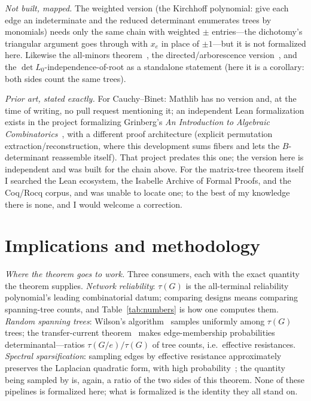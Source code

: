 \documentclass[11pt]{article}
\begin{document}
\emph{Not built, mapped.} The weighted version (the Kirchhoff polynomial: give each edge an
indeterminate and the reduced determinant enumerates trees by monomials) needs only the same
chain with weighted $\pm$ entries---the dichotomy's triangular argument goes through with
$x_e$ in place of $\pm1$---but it is not formalized here. Likewise the all-minors
theorem~\cite{ChaikenKleitman1978}, the directed/arborescence version~\cite{Tutte1948}, and the
$\det L_0$-independence-of-root as a standalone statement (here it is a corollary: both sides
count the same trees).

\emph{Prior art, stated exactly.} For Cauchy--Binet: Mathlib has no version and, at the time of
writing, no pull request mentioning it; an independent Lean formalization exists in the
project formalizing Grinberg's \emph{An Introduction to Algebraic
Combinatorics}~\cite{Grinberg,FaabianRepo}, with a different proof architecture (explicit
permutation extraction/reconstruction, where this development sums fibers and lets the
$B$-determinant reassemble itself). That project predates this one; the version here is
independent and was built for the chain above. For the matrix-tree theorem itself I searched
the Lean ecosystem, the Isabelle Archive of Formal Proofs, and the Coq/Rocq corpus, and was
unable to locate one; to the best of my knowledge there is none, and I would welcome a
correction.

\section{Implications and methodology}
\label{sec:implications}

\emph{Where the theorem goes to work.} Three consumers, each with the exact quantity the
theorem supplies. \emph{Network reliability}: $\tau(G)$ is the all-terminal reliability
polynomial's leading combinatorial datum; comparing designs means comparing spanning-tree
counts, and Table~\ref{tab:numbers} is how one computes them. \emph{Random spanning trees}:
Wilson's algorithm~\cite{Wilson1996} samples uniformly among $\tau(G)$ trees; the
transfer-current theorem~\cite{BurtonPemantle1993} makes edge-membership probabilities
determinantal---ratios $\tau(G/e)/\tau(G)$ of tree counts, i.e.\ effective resistances.
\emph{Spectral sparsification}: sampling edges by effective resistance approximately preserves
the Laplacian quadratic form, with high probability~\cite{SpielmanSrivastava2011}; the quantity being sampled by is, again, a ratio of the
two sides of this theorem. None of these pipelines is formalized here; what is formalized is the
identity they all stand on.
\end{document}
